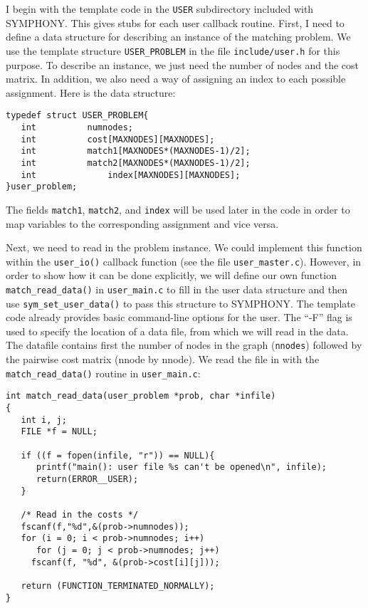 \documentclass[11pt]{article}
\begin{document}
I begin with the template code in the \texttt{USER} subdirectory included with
SYMPHONY. This gives stubs for each user callback routine. First, I need to
define a data structure for describing an instance of the matching problem. We
use the template structure \texttt{USER\_PROBLEM} in the file
\texttt{include/user.h} for this purpose.  To describe an instance, we just
need the number of nodes and the cost matrix. In addition, we also need a way
of assigning an index to each possible assignment. Here is the data
structure: 
\newpage
\begin{verbatim}
typedef struct USER_PROBLEM{
   int		    numnodes;
   int		    cost[MAXNODES][MAXNODES];
   int		    match1[MAXNODES*(MAXNODES-1)/2];
   int		    match2[MAXNODES*(MAXNODES-1)/2]; 
   int              index[MAXNODES][MAXNODES];
}user_problem;
\end{verbatim}

The fields \texttt{match1}, \texttt{match2}, and
\texttt{index} will be used later in the code in order to map variables to the
corresponding assignment and vice versa. 

Next, we need to read in the problem instance. We could implement this
function within the \texttt{user\_io()} callback function (see the file
\texttt{user\_master.c}). However, in order to show how it can be done
explicitly, we will define our own function \texttt{match\_read\_data()} in
\texttt{user\_main.c} to fill in the user data structure and then use
\texttt{sym\_set\_user\_data()} to pass this structure to SYMPHONY. The
template code already provides basic command-line options for the user. The
``-F'' flag is used to specify the location of a data file, from which we will
read in the data. The datafile contains first the number of nodes in the graph
(\texttt{nnodes}) followed by the pairwise cost matrix (nnode by nnode).  We
read the file in with the \texttt{match\_read\_data()} routine in
\texttt{user\_main.c}:


\begin{verbatim}
int match_read_data(user_problem *prob, char *infile)
{
   int i, j;
   FILE *f = NULL;

   if ((f = fopen(infile, "r")) == NULL){
      printf("main(): user file %s can't be opened\n", infile);
      return(ERROR__USER); 
   }

   /* Read in the costs */
   fscanf(f,"%d",&(prob->numnodes));
   for (i = 0; i < prob->numnodes; i++)
      for (j = 0; j < prob->numnodes; j++)
	 fscanf(f, "%d", &(prob->cost[i][j]));
   
   return (FUNCTION_TERMINATED_NORMALLY);
}
\end{verbatim}   
\end{document}
